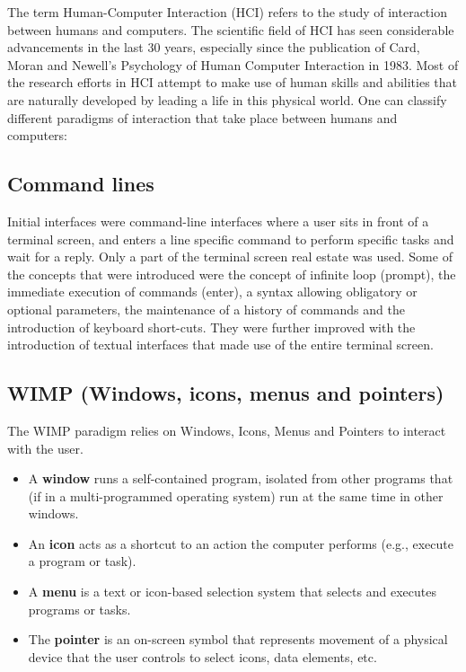 The term Human-Computer Interaction (HCI) refers to the study of interaction between humans and computers. The scientific field of HCI has seen considerable advancements in the last 30 years, especially since the publication of Card, Moran and Newell’s Psychology of Human Computer Interaction in 1983. Most of the research efforts in HCI attempt to make use of human skills and abilities that are naturally developed by leading a life in this physical world. One can classify different paradigms of interaction that take place between humans and computers:

\subsection{Command lines}

Initial interfaces were command-line interfaces where a user sits in front of a terminal screen, and enters a line specific command to perform specific tasks and wait for a reply. Only a part of the terminal screen real estate was used. Some of the concepts that were introduced were the concept of infinite loop (prompt), the immediate execution of commands (enter), a syntax allowing obligatory or optional parameters, the maintenance of a history of commands and the introduction of keyboard short-cuts. They were further improved with the introduction of textual interfaces that made use of the entire terminal screen.

\subsection{WIMP (Windows, icons, menus and pointers)}

The WIMP paradigm relies on Windows, Icons, Menus and Pointers to interact with the user.  

\begin{itemize}
\item A \textbf{window} runs a self-contained program, isolated from other programs that (if in a multi-programmed operating system) run at the same time in other windows.
\item An \textbf{icon} acts as a shortcut to an action the computer performs (e.g., execute a program or task).
\item A \textbf{menu} is a text or icon-based selection system that selects and executes programs or tasks.
\item The \textbf{pointer} is an on-screen symbol that represents movement of a physical device that the user controls to select icons, data elements, etc.
\end{itemize}

